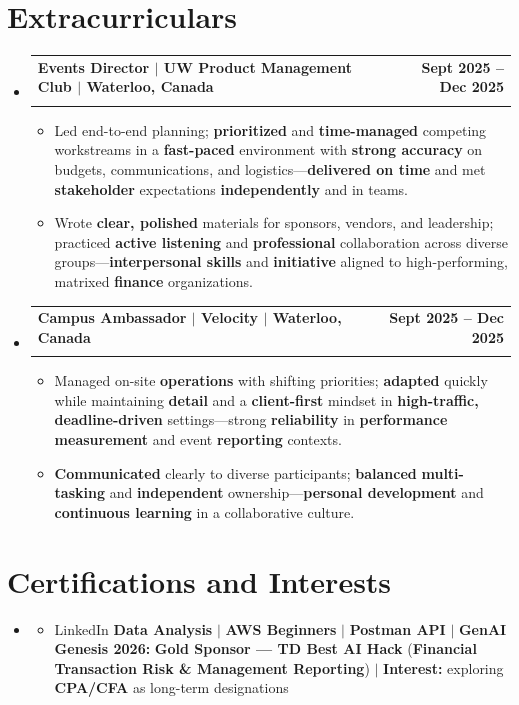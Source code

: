 \documentclass[letterpaper,10pt]{article}
\makeatletter
\newcommand{\resumeItem}[1]{
  \item\small{
    {#1 \vspace{-1pt}}
  }
}
\newcommand{\resumeSubheading}[4]{
  \vspace{-1pt}\item
    \begin{tabular*}{1.0\textwidth}[t]{l@{\extracolsep{\fill}}r}
      \textbf{#1} & \textbf{\small #2} \\
      \textit{\small#3} & \textit{\small #4} \\[-2pt]
    \end{tabular*}\vspace{-7pt}
}
\newcommand{\resumeSubHeadingListStart}{\begin{itemize}[leftmargin=0.0in, label={}]}
\newcommand{\resumeSubHeadingListEnd}{\end{itemize}}
\newcommand{\resumeItemListStart}{\begin{itemize}[leftmargin=0.15in]}
\newcommand{\resumeItemListEnd}{\end{itemize}\vspace{-4pt}}
\makeatother
\begin{document}
\section{Extracurriculars}
  \resumeSubHeadingListStart
    \resumeSubheading
      {Events Director $|$ UW Product Management Club $|$ Waterloo, Canada}{Sept 2025 -- Dec 2025}
      {}{}
      \vspace{-13pt}
      \resumeItemListStart
      \vspace{-2pt}
        \resumeItem{Led end-to-end planning; \textbf{prioritized} and \textbf{time-managed} competing workstreams in a \textbf{fast-paced} environment with \textbf{strong accuracy} on budgets, communications, and logistics---\textbf{delivered on time} and met \textbf{stakeholder} expectations \textbf{independently} and in teams.}
        \vspace{-2pt}
        \resumeItem{Wrote \textbf{clear, polished} materials for sponsors, vendors, and leadership; practiced \textbf{active listening} and \textbf{professional} collaboration across diverse groups---\textbf{interpersonal skills} and \textbf{initiative} aligned to high-performing, matrixed \textbf{finance} organizations.}
      \resumeItemListEnd
      \vspace{-5pt}
    \resumeSubheading
      {Campus Ambassador $|$ Velocity $|$ Waterloo, Canada}{Sept 2025 -- Dec 2025}
      {}{}
      \vspace{-13pt}
      \resumeItemListStart
      \vspace{-2pt}
        \resumeItem{Managed on-site \textbf{operations} with shifting priorities; \textbf{adapted} quickly while maintaining \textbf{detail} and a \textbf{client-first} mindset in \textbf{high-traffic, deadline-driven} settings---strong \textbf{reliability} in \textbf{performance measurement} and event \textbf{reporting} contexts.}
        \vspace{-2pt}
        \resumeItem{\textbf{Communicated} clearly to diverse participants; \textbf{balanced} \textbf{multi-tasking} and \textbf{independent} ownership---\textbf{personal development} and \textbf{continuous learning} in a collaborative culture.}
      \resumeItemListEnd
      \vspace{-2pt}
  \resumeSubHeadingListEnd
\vspace{-13pt}

\section{Certifications and Interests}
    \resumeSubHeadingListStart
      \item[]
          \resumeItemListStart
            \resumeItem{LinkedIn \textbf{Data Analysis} $|$ \textbf{AWS Beginners} $|$ \textbf{Postman API} $|$ \textbf{GenAI Genesis 2026:} \textbf{Gold Sponsor --- TD Best AI Hack} (\textbf{Financial Transaction Risk \& Management Reporting}) $|$ \textbf{Interest:} exploring \textbf{CPA/CFA} as long-term designations}
          \resumeItemListEnd
          \vspace{-8pt}
   \resumeSubHeadingListEnd
\end{document}
